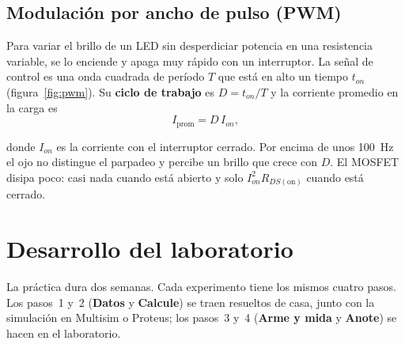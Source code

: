 \documentclass[11pt,a4paper]{article}
\let\needspace\Needspace
\begin{document}
\subsection{Modulación por ancho de pulso (PWM)}
Para variar el brillo de un LED sin desperdiciar potencia en una resistencia variable, se lo
enciende y apaga muy rápido con un interruptor. La señal de control es una onda cuadrada de
período $T$ que está en alto un tiempo $t_{on}$ (figura~\ref{fig:pwm}). Su \textbf{ciclo de
trabajo} es $D = t_{on}/T$ y la corriente promedio en la carga es
\begin{equation}
  I_{\text{prom}} = D\,I_{on},
  \label{eq:pwm}
\end{equation}
\noindent\begin{minipage}[c]{0.50\linewidth}
donde $I_{on}$ es la corriente con el interruptor cerrado. Por encima de unos
\qty{100}{\hertz} el ojo no distingue el parpadeo y percibe un brillo que crece con $D$. El
MOSFET disipa poco: casi nada cuando está abierto y solo $I_{on}^2 R_{DS(\text{on})}$ cuando
está cerrado.
\end{minipage}\hfill
\begin{minipage}[c]{0.46\linewidth}
  \centering
  \label{fig:pwm}
\end{minipage}

\FloatBarrier
\needspace{14\baselineskip}
\section{Desarrollo del laboratorio}
La práctica dura dos semanas. Cada experimento tiene los mismos cuatro pasos. Los pasos~1 y~2
(\textbf{Datos} y \textbf{Calcule}) se traen resueltos de casa, junto con la simulación en
Multisim o Proteus; los pasos~3 y~4 (\textbf{Arme y mida} y \textbf{Anote}) se hacen en el
laboratorio.
\end{document}
